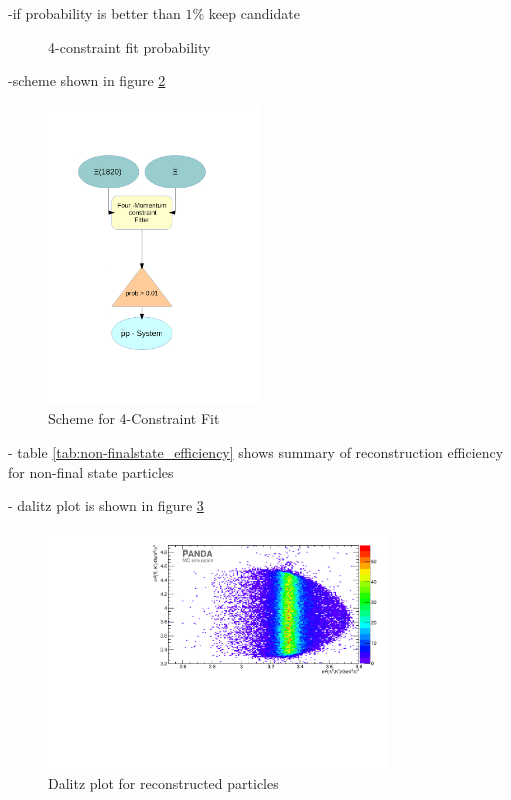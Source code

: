 	
	-if probability is better than $1\%$ keep candidate
	
	\begin{figure}
		\centering
		\caption{4-constraint fit probability}
		\label{fig:xisys_prob}
	\end{figure}
	
	-scheme shown in figure \ref{fig:fourconstraintfit}
	
	\begin{figure}
		\centering
			\includegraphics[width=0.50\textwidth]{./plots/combineCascadeSys.pdf}
		\caption{Scheme for 4-Constraint Fit}
		\label{fig:fourconstraintfit}
	\end{figure}
	
	- table \ref{tab:non-finalstate_efficiency} shows summary of reconstruction efficiency for non-final state particles
	
	- dalitz plot is shown in figure \ref{fig:reco_dalitzplot}
	
	\begin{figure}
		\centering
		\includegraphics[width=0.8\textwidth]{./plots/pbarp/Dalitzplot_reco.pdf}
		\caption{Dalitz plot for reconstructed particles}
		\label{fig:reco_dalitzplot}
	
	\end{figure}
	

